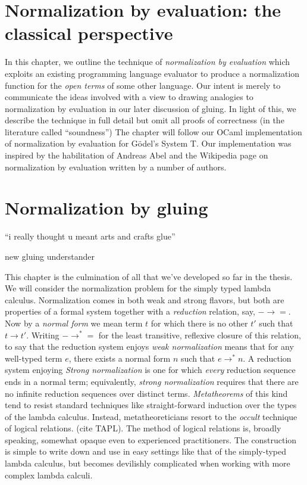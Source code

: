 \documentclass[12pt,twoside]{reedthesis}
\theoremstyle{definition}
\theoremstyle{remark}
\theoremstyle{plain}
\begin{document}
\chapter{Normalization by evaluation: the classical perspective}
In this chapter, we outline the technique of \emph{normalization by evaluation}
which exploits an existing programming language evaluator to produce a
normalization function for the \emph{open terms} of some other language. Our
intent is merely to communicate the ideas involved with a view to drawing
analogies to normalization by evaluation in our later discussion of gluing. In
light of this, we describe the technique in full detail but omit all proofs of
correctness (in the literature called ``soundness'') %
The chapter will follow our OCaml implementation of normalization by evaluation
for G\"odel's System T. Our implementation was inspired by the habilitation of
Andreas Abel and the Wikipedia page on normalization by evaluation written by a
number of authors.

\chapter{Normalization by gluing}
\epigraph{``i really thought u meant arts and crafts glue''}{new gluing understander}
\newcommand{\red}{\rightarrow^{*}} %

This chapter is the culmination of all that we've developed so far in the
thesis. We will consider the normalization problem for the simply typed lambda
calculus. Normalization comes in both weak and strong flavors, but both are
properties of a formal system together with a \emph{reduction} relation, say,
\( - \rightarrow = \). Now by a \emph{normal form} we mean term $t$ for which there is no
other $t'$ such that \( t \rightarrow t' \). Writing \( - \rightarrow^{*} = \) for the least
transitive, reflexive closure of this relation, to say that the reduction system
enjoys \emph{weak normalization} means that for any well-typed term \( e \),
there exists a normal form \( n \) such that \( e \red n\). A reduction system
enjoying \emph{Strong normalization} is one for which \emph{every} reduction
sequence ends in a normal term; equivalently, \emph{strong normalization}
requires that there are no infinite reduction sequences over distinct terms.
\emph{Metatheorems} of this kind tend to resist standard techniques like
straight-forward induction over the types of the lambda calculus. Instead,
metatheoreticians resort to the \emph{occult} technique of logical relations.
(cite TAPL). The method of logical relations is, broadly speaking, somewhat
opaque even to experienced practitioners. The construction is simple to write
down and use in easy settings like that of the simply-typed lambda calculus, but
becomes devilishly complicated when working with more complex lambda calculi.
\end{document}
